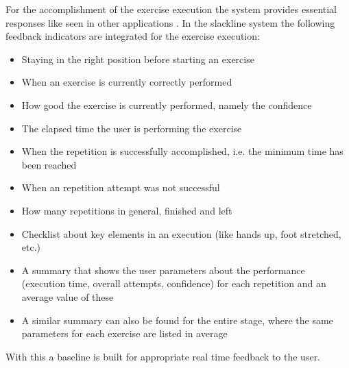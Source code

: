 For the accomplishment of the exercise execution the system provides essential responses like seen in other applications \textbf{}. In the slackline system the following feedback indicators are integrated for the exercise execution:
\begin{itemize}
\item Staying in the right position before starting an exercise
\item When an exercise is currently correctly performed
\item How good the exercise is currently performed, namely the confidence
\item The elapsed time the user is performing the exercise
\item When the repetition is successfully accomplished, i.e. the minimum time has been reached
\item When an repetition attempt was not successful
\item How many repetitions in general, finished and left
\item Checklist about key elements in an execution (like hands up, foot stretched, etc.)
\item A summary that shows the user parameters about the performance (execution time, overall attempts, confidence) for each repetition and an average value of these
\item A similar summary can also be found for the entire stage, where the same parameters for each exercise are listed in average
\end{itemize}
With this a baseline is built for appropriate real time feedback to the user.

